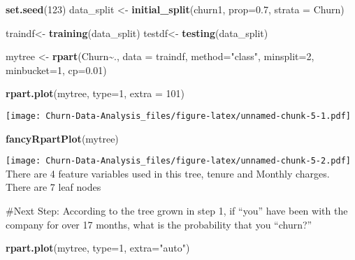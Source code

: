 \documentclass[
]{article}
\newenvironment{Shaded}{\begin{snugshade}}{\end{snugshade}}
\newcommand{\AttributeTok}[1]{\textcolor[rgb]{0.13,0.29,0.53}{#1}}
\newcommand{\DecValTok}[1]{\textcolor[rgb]{0.00,0.00,0.81}{#1}}
\newcommand{\FloatTok}[1]{\textcolor[rgb]{0.00,0.00,0.81}{#1}}
\newcommand{\FunctionTok}[1]{\textcolor[rgb]{0.13,0.29,0.53}{\textbf{#1}}}
\newcommand{\NormalTok}[1]{#1}
\newcommand{\OtherTok}[1]{\textcolor[rgb]{0.56,0.35,0.01}{#1}}
\newcommand{\SpecialCharTok}[1]{\textcolor[rgb]{0.81,0.36,0.00}{\textbf{#1}}}
\newcommand{\StringTok}[1]{\textcolor[rgb]{0.31,0.60,0.02}{#1}}
\begin{document}
\begin{Shaded}
\begin{Highlighting}[]
\FunctionTok{set.seed}\NormalTok{(}\DecValTok{123}\NormalTok{)}
\NormalTok{data\_split }\OtherTok{\textless{}{-}} \FunctionTok{initial\_split}\NormalTok{(churn1, }\AttributeTok{prop=}\FloatTok{0.7}\NormalTok{, }\AttributeTok{strata =}\NormalTok{ Churn)}

\NormalTok{traindf}\OtherTok{\textless{}{-}} \FunctionTok{training}\NormalTok{(data\_split)}
\NormalTok{testdf}\OtherTok{\textless{}{-}} \FunctionTok{testing}\NormalTok{(data\_split)}

\NormalTok{mytree }\OtherTok{\textless{}{-}} \FunctionTok{rpart}\NormalTok{(Churn}\SpecialCharTok{\textasciitilde{}}\NormalTok{., }\AttributeTok{data =}\NormalTok{ traindf, }\AttributeTok{method=}\StringTok{"class"}\NormalTok{, }\AttributeTok{minsplit=}\DecValTok{2}\NormalTok{, }\AttributeTok{minbucket=}\DecValTok{1}\NormalTok{, }\AttributeTok{cp=}\FloatTok{0.01}\NormalTok{)}


\FunctionTok{rpart.plot}\NormalTok{(mytree, }\AttributeTok{type=}\DecValTok{1}\NormalTok{, }\AttributeTok{extra =} \DecValTok{101}\NormalTok{)}
\end{Highlighting}
\end{Shaded}

\texttt{[image: Churn-Data-Analysis\_files/figure-latex/unnamed-chunk-5-1.pdf]}

\begin{Shaded}
\begin{Highlighting}[]
\FunctionTok{fancyRpartPlot}\NormalTok{(mytree)}
\end{Highlighting}
\end{Shaded}

\texttt{[image: Churn-Data-Analysis\_files/figure-latex/unnamed-chunk-5-2.pdf]}
There are 4 feature variables used in this tree, tenure and Monthly
charges. There are 7 leaf nodes

\#Next Step: According to the tree grown in step 1, if ``you'' have been
with the company for over 17 months, what is the probability that you
``churn?''

\begin{Shaded}
\begin{Highlighting}[]
\FunctionTok{rpart.plot}\NormalTok{(mytree, }\AttributeTok{type=}\DecValTok{1}\NormalTok{, }\AttributeTok{extra=}\StringTok{"auto"}\NormalTok{)}
\end{Highlighting}
\end{Shaded}
\end{document}
